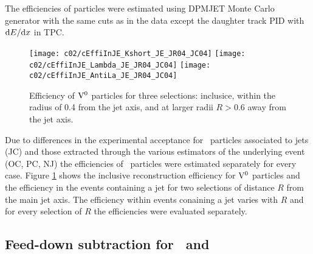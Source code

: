 The efficiencies of \Vzero particles were estimated using DPMJET Monte Carlo generator \cite{Roesler:2000he} with the same cuts as in the data except the daughter track PID with ${\rm d}E/{\rm d}x$ in TPC. 

\begin{figure}[htb]
\begin{center}
\texttt{[image: c02/cEffiInJE\_Kshort\_JE\_JR04\_JC04]}
\texttt{[image: c02/cEffiInJE\_Lambda\_JE\_JR04\_JC04]}
\texttt{[image: c02/cEffiInJE\_AntiLa\_JE\_JR04\_JC04]}
\caption{Efficiency of ${\rm V}^{0}$ particles for three selections: inclusice, within the radius of 0.4 from the jet axis, and at larger radii $R>0.6$ away from the jet axis.}
\label{fig:c02EffiIncV0s}
\end{center}
\end{figure}

Due to differences in the experimental acceptance for \Vzero\ particles associated to jets (JC) and those extracted through the various estimators of the underlying event (OC, PC, NJ) the efficiencies of \Vzero\ particles were estimated separately for every case. Figure \ref{fig:c02EffiIncV0s} shows the inclusive reconstruction efficiency for ${\rm V}^{0}$ particles and the efficiency in the events containing a jet for two selections of distance $R$ from the main jet axis. The efficiency within events conaining a jet varies with $R$ and for every selection of $R$ the efficiencies were evaluated separately.

\subsection{Feed-down subtraction for \lda\ and \alda}

